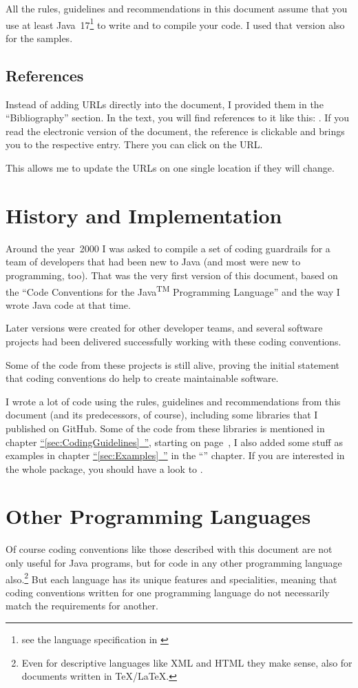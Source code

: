 \documentclass[11pt,a4paper, titlepage, parskip=half, headsepline, footsepline, cleardoublepage=current, headheight=1cm]{scrbook}
\newcommand*{\tqfullref}[1]{\hyperref[{#1}]{“\ref*{#1}~\nameref*{#1}”}}
\begin{document}
All the rules, guidelines and recommendations in this document assume that you use at least Java~17\footnote{see the language specification in \autocite{ORACLE_DOC_LANGUAGE_SPECIFICATION}} to write and to compile your code. I used that version also for the samples.

\subsection{References}
Instead of adding URLs directly into the document, I provided them in the “Bibliography” section. In the text, you will find references to it like this: \autocite{ORACLE_DOC_LANGUAGE_SPECIFICATION}. If you read the electronic version of the document, the reference is clickable and brings you to the respective entry. There you can click on the URL.

This allows me to update the URLs on one single location if they will change. 

\section{History and Implementation}
Around the year~2000 I was asked to compile a set of coding guardrails for a team of developers that had been new to Java (and most were new to programming, too). That was the very first version of this document, based on the “Code Conventions for the Java\textsuperscript{TM} Programming Language”\autocite{SUN_CODE_CONVENTIONS} and the way I wrote Java code at that time.

Later versions were created for other developer teams, and several software projects had been delivered successfully working with these coding conventions.

Some of the code from these projects is still alive, proving the initial statement that coding conventions do help to create maintainable software.

I wrote a lot of code using the rules, guidelines and recommendations from this document (and its predecessors, of course), including some libraries that I published on GitHub. Some of the code from these libraries is mentioned in chapter \tqfullref{sec:CodingGuidelines}, starting on page~\pageref{sec:CodingGuidelines}, I also added some stuff as examples in chapter \tqfullref{sec:Examples} in the “” chapter. If you are interested in the whole package, you should have a look to \autocite{TQUADRAT_ORG}.

\section{Other Programming Languages}\label{sec:OtherProgrammingLanguages}
Of course coding conventions like those described with this document are not only useful for Java programs, but for code in any other programming language also.\footnote{Even for descriptive languages like XML and HTML they make sense, also for documents written in \TeX/\LaTeX.} But each language has its unique features and specialities, meaning that coding conventions written for one programming language do not necessarily match the requirements for another.
\end{document}
